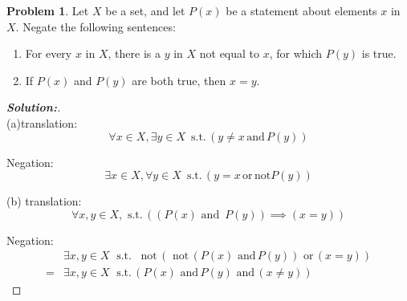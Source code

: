 \documentclass[12pt]{article}
\theoremstyle{definition}\newtheorem{problem}{Problem}
\newenvironment{solution}{\begin{proof}[\bfseries\textup{Solution:}]}{\end{proof}}
\begin{document}
\newpage
\begin{problem}
Let $X$ be a set, and let $P(x)$ be a statement about elements $x$ in $X$.  Negate the following sentences:
\begin{enumerate}
\item For every $x$ in $X$, there is a $y$ in $X$ not equal to $x$, for which $P(y)$ is true.
\item If $P(x)$ and $P(y)$ are both true, then $x = y$.
\end{enumerate}
\end{problem}
\begin{solution} \, \\

(a)translation: $$ 
    \forall x \in X, \exists y \in X \, \text{ s.t.}\, ( y \neq x\, \text{and}\, P(y)) 
$$ 

Negation: $$ 
     \exists x \in X, \forall y \in X \, \text{ s.t.}\, ( y = x\, \text{or}\, \text{not} P(y))
$$ 


(b) translation:$$ 
    \forall x, y \in X , \text{ s.t.}\,( (P(x) \text{ and }\, P(y)) \implies (x = y))
$$ 

Negation:
\begin{align}
 &   \exists x, y \in X \; \text{ s.t. }\,\text{ not}\, (\text{ not}\,(P(x) \text{  and}\, P(y)) \text{ or}\, (x = y))\\  
=  &\exists x, y \in X \; \text{ s.t.}\, (  P(x) \text{ and}\,  P(y) \text{ and}\, (x \neq y))\,
\end{align}

\end{solution}
\end{document}
